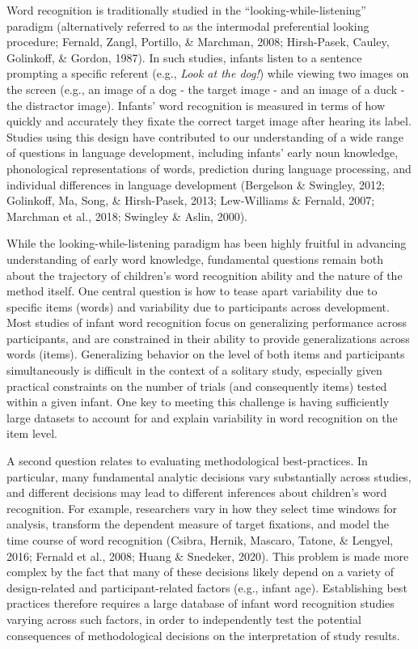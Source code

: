 \documentclass[10pt, letterpaper]{article}
\begin{document}
Word recognition is traditionally studied in the
``looking-while-listening'' paradigm (alternatively referred to as the
intermodal preferential looking procedure; Fernald, Zangl, Portillo, \&
Marchman, 2008; Hirsh-Pasek, Cauley, Golinkoff, \& Gordon, 1987). In
such studies, infants listen to a sentence prompting a specific referent
(e.g., \emph{Look at the dog!}) while viewing two images on the screen
(e.g., an image of a dog - the target image - and an image of a duck -
the distractor image). Infants' word recognition is measured in terms of
how quickly and accurately they fixate the correct target image after
hearing its label. Studies using this design have contributed to our
understanding of a wide range of questions in language development,
including infants' early noun knowledge, phonological representations of
words, prediction during language processing, and individual differences
in language development (Bergelson \& Swingley, 2012; Golinkoff, Ma,
Song, \& Hirsh-Pasek, 2013; Lew-Williams \& Fernald, 2007; Marchman et
al., 2018; Swingley \& Aslin, 2000).

While the looking-while-listening paradigm has been highly fruitful in
advancing understanding of early word knowledge, fundamental questions
remain both about the trajectory of children's word recognition ability
and the nature of the method itself. One central question is how to
tease apart variability due to specific items (words) and variability
due to participants across development. Most studies of infant word
recognition focus on generalizing performance across participants, and
are constrained in their ability to provide generalizations across words
(items). Generalizing behavior on the level of both items and
participants simultaneously is difficult in the context of a solitary
study, especially given practical constraints on the number of trials
(and consequently items) tested within a given infant. One key to
meeting this challenge is having sufficiently large datasets to account
for and explain variability in word recognition on the item level.

A second question relates to evaluating methodological best-practices.
In particular, many fundamental analytic decisions vary substantially
across studies, and different decisions may lead to different inferences
about children's word recognition. For example, researchers vary in how
they select time windows for analysis, transform the dependent measure
of target fixations, and model the time course of word recognition
(Csibra, Hernik, Mascaro, Tatone, \& Lengyel, 2016; Fernald et al.,
2008; Huang \& Snedeker, 2020). This problem is made more complex by the
fact that many of these decisions likely depend on a variety of
design-related and participant-related factors (e.g., infant age).
Establishing best practices therefore requires a large database of
infant word recognition studies varying across such factors, in order to
independently test the potential consequences of methodological
decisions on the interpretation of study results.
\end{document}
